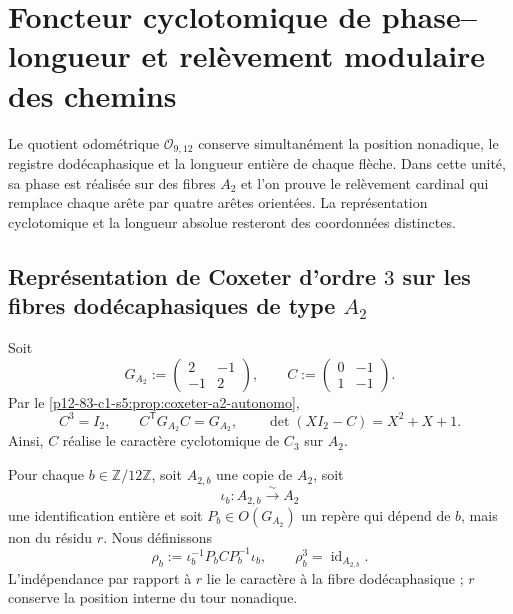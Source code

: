 {\section{Foncteur cyclotomique de phase--longueur et relèvement modulaire des chemins}
\label{p12-83-c1-s10:chap:funtor-ciclotomico-elevacion-caminos}

Le quotient odométrique \(\mathcal O_{9,12}\) conserve simultanément la
position nonadique, le registre dodécaphasique et la longueur entière de chaque
flèche. Dans cette unité, sa phase est réalisée sur des fibres \(A_2\) et l’on prouve
le relèvement cardinal qui remplace chaque arête par quatre arêtes
orientées. La représentation cyclotomique et la longueur absolue
resteront des coordonnées distinctes.

\subsection{Représentation de Coxeter d’ordre \(3\) sur les fibres dodécaphasiques de type \(A_2\)}

Soit
\begin{equation}
 G_{A_2}:=
 \begin{pmatrix}2&-1\\-1&2\end{pmatrix},
 \qquad
 C:=
 \begin{pmatrix}0&-1\\1&-1\end{pmatrix}.
 \label{p12-83-c1-s10:eq:u006b-dato-coxeter}
\end{equation}
Par le \cref{p12-83-c1-s5:prop:coxeter-a2-autonomo},
\begin{equation}
 C^3=I_2,
 \qquad
 C^{\mathsf T}G_{A_2}C=G_{A_2},
 \qquad
 \det(XI_2-C)=X^2+X+1.
 \label{p12-83-c1-s10:eq:u006b-identidades-coxeter}
\end{equation}
Ainsi, \(C\) réalise le caractère cyclotomique de \(C_3\) sur \(A_2\).

Pour chaque \(b\in\mathbb Z/12\mathbb Z\), soit \(A_{2,b}\) une copie de
\(A_2\), soit
\[
 \iota_b:A_{2,b}\xrightarrow{\;\sim\;}A_2
\]
une identification entière et soit
\(P_b\in O(G_{A_2})\) un repère qui dépend de \(b\), mais non du résidu
\(r\). Nous définissons
\begin{equation}
 \rho_b:=
 \iota_b^{-1}P_bCP_b^{-1}\iota_b,
 \qquad
 \rho_b^3=\operatorname{id}_{A_{2,b}}.
 \label{p12-83-c1-s10:eq:u006b-rho-fibra}
\end{equation}
L’indépendance par rapport à \(r\) lie le caractère à la fibre
dodécaphasique ; \(r\) conserve la position interne du tour nonadique.

}
